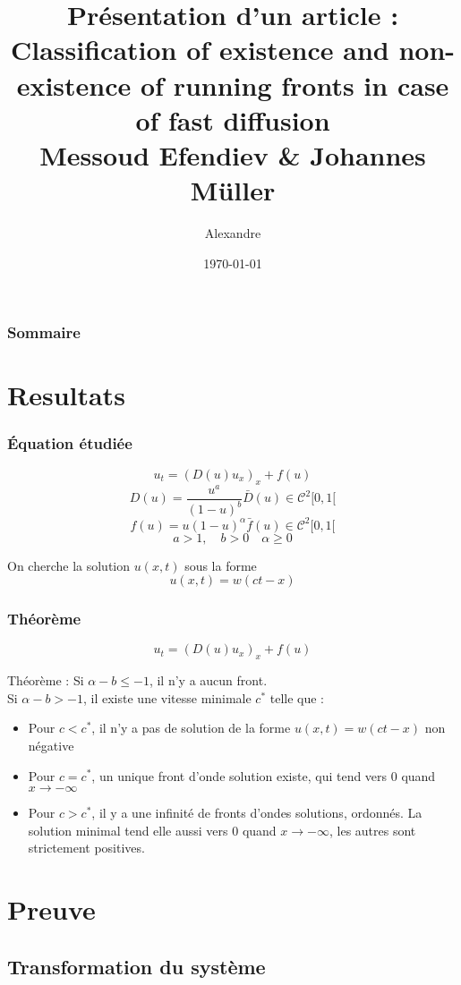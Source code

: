 \documentclass[handout]{beamer}
\title[Class. Running Fronts]{Pr\'esentation d'un article : \\ Classification of existence and non-existence of running fronts in case of fast diffusion\\\small{Messoud Efendiev \& Johannes M\"uller}}
\author{Alexandre \bsc{Vieira}}
\institute{INSA de Rouen}
\date{\today}
\begin{document}
\begin{frame}
\titlepage
\end{frame}

\begin{frame}
	\frametitle{Sommaire}
	\tableofcontents
\end{frame}

\section{Resultats}
\begin{frame}
	\frametitle{Équation étudiée}
	\begin{equation} \label{eqnG} u_t=(D(u)u_x)_x + f(u)\end{equation}
	\[D(u)=\frac{u^a}{(1-u)^b}\bar{D}(u)\in\mathcal{C}^2[0,1[\]
	\[f(u)=u(1-u)^\alpha \bar{f}(u)\in\mathcal{C}^2[0,1[\]
	\[a>1,\hspace{1em} b>0 \hspace{1em} \alpha\geq 0\]

\bigskip
	On cherche la solution $u(x,t)$ sous la forme \[u(x,t)=w(ct-x)\]
\end{frame}

\begin{frame}
	\frametitle{Théorème}
	\[u_t=(D(u)u_x)_x + f(u)\]

	\begin{block}{Théorème :}
	Si $\alpha-b\leq -1$, il n'y a aucun front.\\
	Si $\alpha-b>-1$, il existe une vitesse minimale $c^*$ telle que :
	\begin{itemize}
		\item Pour $c<c^*$, il n'y a pas de solution de la forme $u(x,t)=w(ct-x)$ non négative
		\item Pour $c=c^*$, un unique front d'onde solution existe, qui tend vers $0$ quand $x\to-\infty$
		\item Pour $c>c^*$, il y a une infinité de fronts d'ondes solutions, ordonnés. La solution minimal tend elle aussi vers 0 quand $x\to -\infty$, les autres sont strictement positives.
	\end{itemize}
	\end{block}
\end{frame}

\section{Preuve}
\subsection{Transformation du système}
\end{document}
